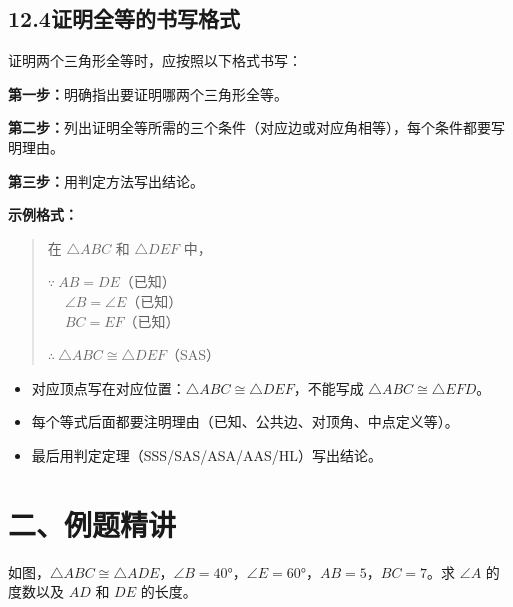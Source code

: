 \documentclass[12pt, a4paper]{ctexart}
\begin{document}
\subsection*{12.4\quad 证明全等的书写格式}

\begin{knowledgebox}[标准书写格式]
证明两个三角形全等时，应按照以下格式书写：

\textbf{第一步：}明确指出要证明哪两个三角形全等。

\textbf{第二步：}列出证明全等所需的三个条件（对应边或对应角相等），每个条件都要写明理由。

\textbf{第三步：}用判定方法写出结论。

\textbf{示例格式：}
\begin{quote}
在 $\triangle ABC$ 和 $\triangle DEF$ 中，

$\because\ AB = DE$（已知）\\
$\quad\ \angle B = \angle E$（已知）\\
$\quad\ BC = EF$（已知）

$\therefore\ \triangle ABC \cong \triangle DEF$（SAS）
\end{quote}
\end{knowledgebox}

\begin{warnbox}[书写规范提醒]
\begin{itemize}[nosep]
  \item 对应顶点写在对应位置：$\triangle ABC \cong \triangle DEF$，不能写成 $\triangle ABC \cong \triangle EFD$。
  \item 每个等式后面都要注明理由（已知、公共边、对顶角、中点定义等）。
  \item 最后用判定定理（SSS/SAS/ASA/AAS/HL）写出结论。
\end{itemize}
\end{warnbox}

\section*{\textcolor{examorange}{二、例题精讲}}

\begin{examplebox}
如图，$\triangle ABC \cong \triangle ADE$，$\angle B = 40°$，$\angle E = 60°$，$AB = 5$，$BC = 7$。求 $\angle A$ 的度数以及 $AD$ 和 $DE$ 的长度。

\begin{center}
\end{center}
\end{examplebox}
\end{document}
